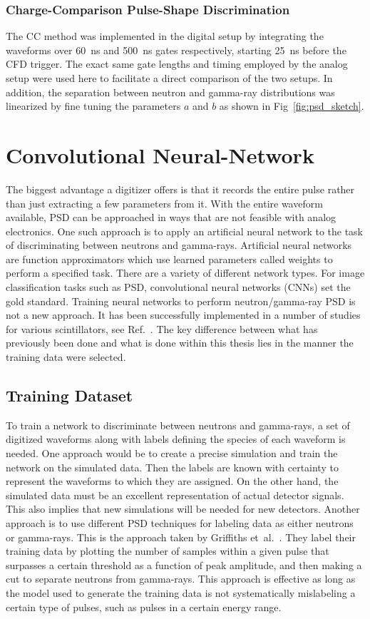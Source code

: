 \documentclass[main.tex]{subfiles}
\begin{document}
\subsubsection{Charge-Comparison Pulse-Shape Discrimination}
The CC method was implemented in the digital setup by integrating the waveforms over \SI{60}{ns} and \SI{500}{ns} gates respectively, starting \SI{25}{ns} before the CFD trigger. The exact same gate lengths and timing employed by the analog setup were used here to facilitate a direct comparison of the two setups. In addition, the separation between neutron and gamma-ray distributions was linearized by fine tuning the parameters $a$ and $b$ as shown in Fig~\ref{fig:psd_sketch}.

\section{Convolutional Neural-Network}\label{sec:cnn}
The biggest advantage a digitizer offers is that it records the entire pulse rather than just extracting a few parameters from it. With the entire waveform available, PSD can be approached in ways that are not feasible with analog electronics. One such approach is to apply an artificial neural network to the task of discriminating between neutrons and gamma-rays. 
Artificial neural networks are function approximators which use learned parameters called weights to perform a specified task. There are a variety of different network types. For image classification tasks such as PSD, convolutional neural networks (CNNs) set the gold standard. Training neural networks to perform neutron/gamma-ray PSD is not a new approach. It has been successfully implemented in a number of studies for various scintillators, see Ref.~\cite{Griffiths}. The key difference between what has previously been done and what is done within this thesis lies in the manner the training data were selected.

\subsection{Training Dataset}
To train a network to discriminate between neutrons and gamma-rays, a set of digitized waveforms along with labels defining the species of each waveform is needed. One approach would be to create a precise simulation and train the network on the simulated data. Then the labels are known with certainty to represent the waveforms to which they are assigned. On the other hand, the simulated data must be an excellent representation of actual detector signals. This also implies that new simulations will be needed for new detectors. Another approach is to use different PSD techniques for labeling data as either neutrons or gamma-rays. This is the approach taken by  Griffiths et~al.~\cite{Griffiths}. They label their training data by plotting the number of samples within a given pulse that surpasses a certain threshold as a function of peak amplitude, and then making a cut to separate neutrons from gamma-rays. This approach is effective as long as the model used to generate the training data is not systematically mislabeling a certain type of pulses, such as pulses in a certain energy range. 
\end{document}
